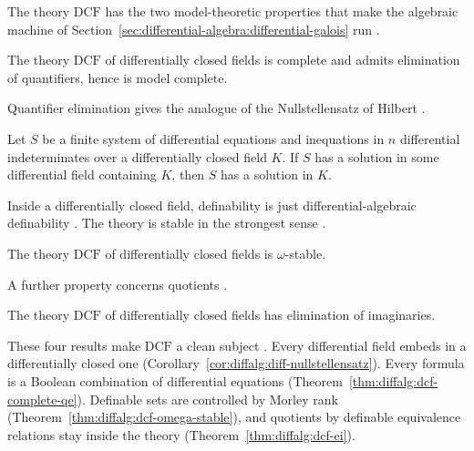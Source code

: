 The theory $\mathrm{DCF}$ has the two model-theoretic properties that
make the algebraic machine of
Section~\ref{sec:differential-algebra:differential-galois} run
\cite[pp.~129--134]{Wood1998DifferentiallyClosed}.

\begin{theorem}\label{thm:diffalg:dcf-complete-qe}
The theory $\mathrm{DCF}$ of differentially closed fields is complete
and admits elimination of quantifiers, hence is model complete.
\end{theorem}

Quantifier elimination gives the analogue of the Nullstellensatz of
Hilbert
\cite[pp.~129--132]{Wood1998DifferentiallyClosed}.

\begin{corollary}\label{cor:diffalg:diff-nullstellensatz}
Let $S$ be a finite system of differential equations and inequations in
$n$ differential indeterminates over a differentially closed field $K$.
If $S$ has a solution in some differential field containing $K$, then
$S$ has a solution in $K$.
\end{corollary}

Inside a differentially closed field, definability is just
differential-algebraic definability
\cite[pp.~132--134]{Wood1998DifferentiallyClosed}. The theory is stable
in the strongest sense \cite[p.~134]{Wood1998DifferentiallyClosed}.

\begin{theorem}\label{thm:diffalg:dcf-omega-stable}
The theory $\mathrm{DCF}$ of differentially closed fields is
$\omega$-stable.
\end{theorem}

A further property concerns quotients
\cite[pp.~133--134]{Wood1998DifferentiallyClosed}.

\begin{theorem}\label{thm:diffalg:dcf-ei}
The theory $\mathrm{DCF}$ of differentially closed fields has
elimination of imaginaries.
\end{theorem}

These four results make $\mathrm{DCF}$ a clean subject
\cite[pp.~129--134]{Wood1998DifferentiallyClosed}. Every differential
field embeds in a differentially closed one
(Corollary~\ref{cor:diffalg:diff-nullstellensatz}). Every formula is a
Boolean combination of differential equations
(Theorem~\ref{thm:diffalg:dcf-complete-qe}). Definable sets are
controlled by Morley rank
(Theorem~\ref{thm:diffalg:dcf-omega-stable}), and quotients by definable
equivalence relations stay inside the theory
(Theorem~\ref{thm:diffalg:dcf-ei}).

